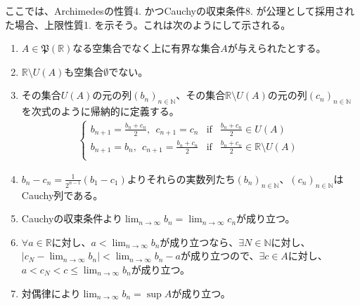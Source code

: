 \documentclass[dvipdfmx]{jsarticle}
\begin{document}
\begin{thm}\label{4.1.5.11} ここでは、Archimedesの性質4. かつCauchyの収束条件8. が公理として採用された場合、上限性質1. を示そう。これは次のようにして示される。
\begin{enumerate}
\item
  $A \in \mathfrak{P}\left( \mathbb{R} \right)$なる空集合でなく上に有界な集合$A$が与えられたとする。
\item
  $\mathbb{R} \setminus U(A)$も空集合$\emptyset$でない。
\item
  その集合$U(A)$の元の列$\left( b_{n} \right)_{n \in \mathbb{N}}$、その集合$\mathbb{R} \setminus U(A)$の元の列$\left( c_{n} \right)_{n \in \mathbb{N}}$を次式のように帰納的に定義する。
\begin{align*}
\left\{ \begin{matrix}
b_{n + 1} = \frac{b_{n} + c_{n}}{2},\ \ c_{n + 1} = c_{n} & \mathrm{if} & \frac{b_{n} + c_{n}}{2} \in U(A) \\
b_{n + 1} = b_{n},\ \ c_{n + 1} = \frac{b_{n} + c_{n}}{2} & \mathrm{if} & \frac{b_{n} + c_{n}}{2} \in \mathbb{R} \setminus U(A) \\
\end{matrix} \right.\ 
\end{align*}
\item
  $b_{n} - c_{n} = \frac{1}{2^{n - 1}}\left( b_{1} - c_{1} \right)$よりそれらの実数列たち$\left( b_{n} \right)_{n \in \mathbb{N}}$、$\left( c_{n} \right)_{n \in \mathbb{N}}$はCauchy列である。
\item
  Cauchyの収束条件より$\lim_{n \rightarrow \infty}b_{n} = \lim_{n \rightarrow \infty}c_{n}$が成り立つ。
\item
  $\forall a \in \mathbb{R}$に対し、$a < \lim_{n \rightarrow \infty}b_{n}$が成り立つなら、$\exists N \in \mathbb{N}$に対し、$\left| c_{N} - \lim_{n \rightarrow \infty}b_{n} \right| < \lim_{n \rightarrow \infty}b_{n} - a$が成り立つので、$\exists c \in A$に対し、$a < c_{N} < c \leq \lim_{n \rightarrow \infty}b_{n}$が成り立つ。
\item
  対偶律により$\lim_{n \rightarrow \infty}b_{n} = \sup A$が成り立つ。
\end{enumerate}
\end{thm}
\end{document}
